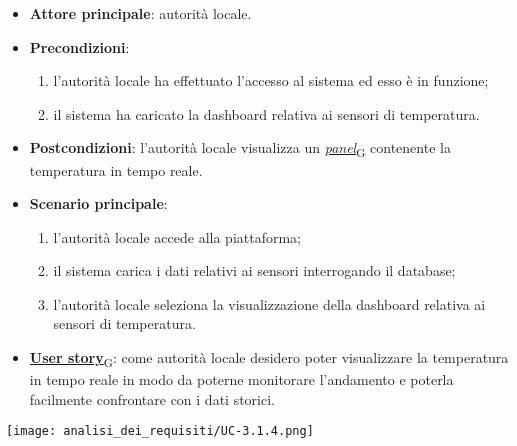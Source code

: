 \begin{itemize}
	\item \textbf{Attore principale}: autorità locale.
	\item \textbf{Precondizioni}:
	      \begin{enumerate}
		      \item l'autorità locale ha effettuato l'accesso al sistema ed esso è in funzione;
		      \item il sistema ha caricato la dashboard relativa ai sensori di temperatura.
	      \end{enumerate}
	\item \textbf{Postcondizioni}: l'autorità locale visualizza un \href{https://7last.github.io/docs/pb/documentazione-interna/glossario\#panel}{\textit{panel}\textsubscript{G}} contenente la temperatura in tempo reale.
	\item \textbf{Scenario principale}:
	      \begin{enumerate}
		      \item l'autorità locale accede alla piattaforma;
		      \item il sistema carica i dati relativi ai sensori interrogando il database;
		      \item l'autorità locale seleziona la visualizzazione della dashboard relativa ai sensori di temperatura.
	      \end{enumerate}
	\item \href{https://7last.github.io/docs/pb/documentazione-interna/glossario\#user-story}{\textbf{User story}\textsubscript{G}}:
	      come autorità locale desidero poter visualizzare la temperatura in tempo reale in modo da poterne monitorare l'andamento
	      e poterla facilmente confrontare con i dati storici.
\end{itemize}
\begin{center}
	\texttt{[image: analisi\_dei\_requisiti/UC-3.1.4.png]}
\end{center}


